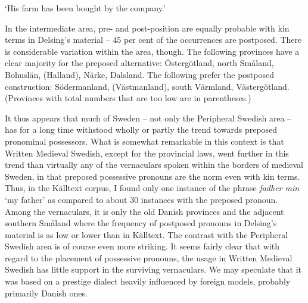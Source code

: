 \begin{styleTranslation}
‘His farm has been bought by the company.’

\end{styleTranslation}

\begin{styleBodyTextFirst}
In the intermediate area, pre- and post-position are equally probable with kin terms in Delsing’s material – 45 per cent of the occurrences are postposed. There is considerable variation within the area, though. The following provinces have a clear majority for the preposed alternative: Östergötland, north Småland, Bohuslän, (Halland), Närke, Dalsland. The following prefer the postposed construction: Södermanland, (Västmanland), south Värmland, Västergötland. (Provinces with total numbers that are too low are in parentheses.)

\end{styleBodyTextFirst}

\begin{styleBodytextC}
It thus appears that much of Sweden – not only the Peripheral Swedish area – has for a long time withstood wholly or partly the trend towards preposed pronominal possessors. What is somewhat remarkable in this context is that Written Medieval Swedish, except for the provincial laws, went further in this trend than virtually any of the vernaculars spoken within the borders of medieval Sweden, in that preposed possessive pronouns are the norm even with kin terms. Thus, in the Källtext corpus, I found only one instance of the phrase \textit{fadher min }‘my father’ as compared to about 30 instances with the preposed pronoun. Among the vernaculars, it is only the old Danish provinces and the adjacent southern Småland where the frequency of postposed pronouns in Delsing’s material is as low or lower than in Källtext. The contrast with the Peripheral Swedish area is of course even more striking. It seems fairly clear that with regard to the placement of possessive pronouns, the usage in Written Medieval Swedish has little support in the surviving vernaculars. We may speculate that it was based on a prestige dialect heavily influenced by foreign models, probably primarily Danish ones.

\end{styleBodytextC}

\begin{styleBodytextC}
  [Warning: Image ignored] %
 

\end{styleBodytextC}

